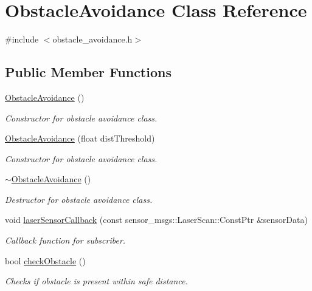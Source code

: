 \hypertarget{classObstacleAvoidance}{}\section{Obstacle\+Avoidance Class Reference}
\label{classObstacleAvoidance}


{\ttfamily \#include $<$obstacle\+\_\+avoidance.\+h$>$}

\subsection*{Public Member Functions}
\begin{DoxyCompactItemize}
\item 
\hyperlink{classObstacleAvoidance_adff25e3149ac860f48af277913c6e51e}{Obstacle\+Avoidance} ()
\begin{DoxyCompactList}\small\item\em Constructor for obstacle avoidance class. \end{DoxyCompactList}\item 
\hyperlink{classObstacleAvoidance_acc575828426b0c1f499f0d2de8e8adc9}{Obstacle\+Avoidance} (float dist\+Threshold)
\begin{DoxyCompactList}\small\item\em Constructor for obstacle avoidance class. \end{DoxyCompactList}\item 
\hyperlink{classObstacleAvoidance_aead959d605cc5599afde7da5e66b24f7}{$\sim$\+Obstacle\+Avoidance} ()
\begin{DoxyCompactList}\small\item\em Destructor for obstacle avoidance class. \end{DoxyCompactList}\item 
void \hyperlink{classObstacleAvoidance_af03480261c682c2b9b4026f377cc9e3f}{laser\+Sensor\+Callback} (const sensor\+\_\+msgs\+::\+Laser\+Scan\+::\+Const\+Ptr \&sensor\+Data)
\begin{DoxyCompactList}\small\item\em Callback function for subscriber. \end{DoxyCompactList}\item 
bool \hyperlink{classObstacleAvoidance_a10de6174bbf71748bb9467981c6f9ab4}{check\+Obstacle} ()
\begin{DoxyCompactList}\small\item\em Checks if obstacle is present within safe distance. \end{DoxyCompactList}\item 

\end{DoxyCompactItemize}
